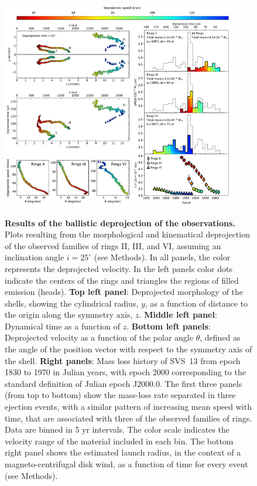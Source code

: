\documentclass[12pt]{mythesis}
\begin{document}
\begin{figure}[p!]
\begin{center}
\includegraphics[width=0.91\textwidth]{figures/ballistic_deprojection.pdf}\\
\caption[Results of the ballistic deprojection of the observations]{{\bf Results of the ballistic deprojection of the observations.} Plots resulting from the morphological and kinematical deprojection of the observed families of rings II, III, and VI, assuming an inclination angle $i=25^\circ$ (see Methods). In all panels, the color represents the deprojected velocity. In the left panels color dots indicate the centers of the rings and triangles the regions of filled emission (heads). {\bf Top left panel}: Deprojected morphology of the shells, showing the cylindrical radius, $y$, as a function of distance to the origin along the symmetry axis, $z$. {\bf Middle left panel}: Dynamical time as a function of $z$. {\bf Bottom left panels}: Deprojected velocity as a function of the polar angle $\theta$, defined as the angle of the position vector with respect to the symmetry axis of the shell. {\bf Right panels}: Mass loss history of SVS~13 from epoch 1830 to 1970 in Julian years, with epoch 2000 corresponding to the standard definition of Julian epoch J2000.0. The first three panels (from top to bottom) show the mass-loss rate separated in three ejection events, with a similar pattern of increasing mean speed with time, that are associated with three of the observed families of rings. Data are binned in 5 yr intervals. The color scale indicates the velocity range of the material included in each bin. The bottom right panel shows the estimated launch radius, in the context of a magneto-centrifugal disk wind, as a function of time for every event (see Methods).
}
\label{fig:tkin}
\end{center}
\end{figure}
\end{document}
